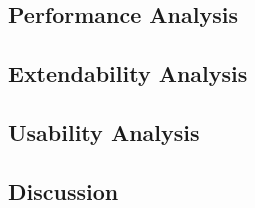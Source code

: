 \subsection{Performance Analysis}
\subsection{Extendability Analysis}
\subsection{Usability Analysis}
\subsection{Discussion}
